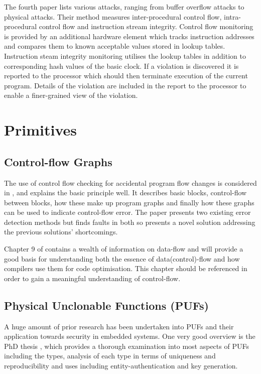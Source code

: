 \ifnotesincluded
{}
\fi

The fourth paper \cite{Arora2006} lists various attacks, ranging from buffer overflow attacks to physical attacks. Their method measures inter-procedural control flow, intra-procedural control flow and instruction stream integrity. Control flow monitoring is provided by an additional hardware element which tracks instruction addresses and compares them to known acceptable values stored in lookup tables. Instruction steam integrity monitoring utilises the lookup tables in addition to corresponding hash values of the basic clock. If a violation is discovered it is reported to the processor which should then terminate execution of the current program. Details of the violation are included in the report to the processor to enable a finer-grained view of the violation.

\section{Primitives}

\subsection{Control-flow Graphs}

The use of control flow checking for accidental program flow changes is considered in \cite{Goloubeva2003}, and explains the basic principle well. It describes basic blocks, control-flow between blocks, how these make up program graphs and finally how these graphs can be used to indicate control-flow error. The paper presents two existing error detection methods but finds faults in both so presents a novel solution addressing the previous solutions' shortcomings.

Chapter 9 of \cite{AhoAlfredV.2014C:pt} contains a wealth of information on data-flow and will provide a good basis for understanding both the essence of data(control)-flow and how compilers use them for code optimisation. This chapter should be referenced in order to gain a meaningful understanding of control-flow.


\subsection{Physical Unclonable Functions (PUFs)}\label{PUFExplaination}

A huge amount of prior research has been undertaken into PUFs and their application towards security in embedded systems. One very good overview is the PhD thesis \cite{Maes2012}, which provides a thorough examination into most aspects of PUFs including the types, analysis of each type in terms of uniqueness and reproducibility and uses including entity-authentication and key generation.

